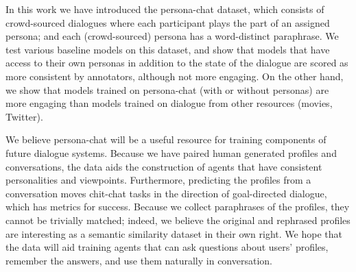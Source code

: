\documentclass[11pt,a4paper]{article}
\begin{document}
In this work we have introduced the {\sc persona-chat} dataset, which consists of crowd-sourced dialogues where each participant plays the part of an assigned persona; and each (crowd-sourced) persona has a word-distinct paraphrase.  We test various baseline models on this dataset, and show that models that have access to their own personas in addition to the state of the dialogue are scored as more consistent by annotators, although not more engaging.   On the other hand, we show that models trained on {\sc persona-chat} (with or without personas) are more engaging than models trained on dialogue from other resources (movies, Twitter).  


We believe {\sc persona-chat} will be a useful resource for training components of future dialogue systems.  Because we have paired human generated profiles and conversations, the data aids the construction of agents that have consistent personalities and viewpoints.  Furthermore, predicting the profiles from a conversation moves chit-chat tasks in the direction of goal-directed dialogue, which has metrics for success. Because we collect paraphrases of the profiles, they cannot be trivially matched; indeed, we believe the original and rephrased profiles are interesting as a semantic similarity dataset in their own right.  We hope that the data will aid training agents that can ask questions about users' profiles, remember the answers, and use them naturally in conversation.  






 









\newpage
\clearpage
\newpage
\clearpage
\appendix
\end{document}
